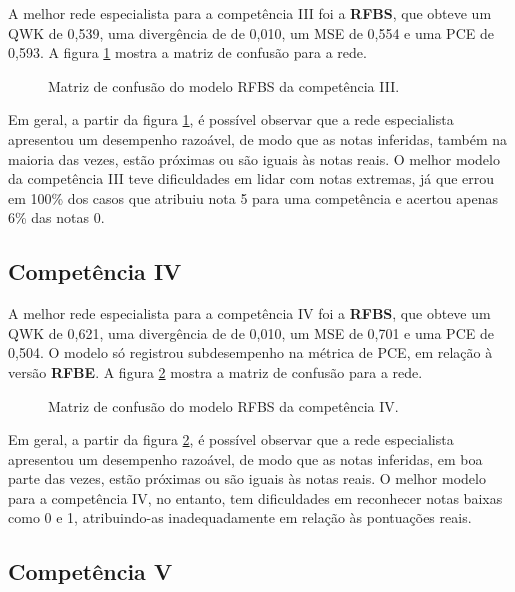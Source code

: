 A melhor rede especialista para a competência III foi a \textbf{RFBS}, que obteve um QWK de 0,539, uma divergência de de 0,010, um MSE de 0,554 e uma PCE de 0,593. A figura \ref{fig:eval-c3-confusion-matrix} mostra a matriz de confusão para a rede.

\begin{figure}[H]
    \centering
    \resizebox{0.5\textwidth}{!}{}
    \caption{Matriz de confusão do modelo RFBS da competência III.}
    \label{fig:eval-c3-confusion-matrix}
\end{figure}

Em geral, a partir da figura \ref{fig:eval-c3-confusion-matrix}, é possível observar que a rede especialista apresentou um desempenho razoável, de modo que as notas inferidas, também na maioria das vezes, estão próximas ou são iguais às notas reais. O melhor modelo da competência III teve dificuldades em lidar com notas extremas, já que errou em 100\% dos casos que atribuiu nota 5 para uma competência e acertou apenas 6\% das notas 0.

\subsection{Competência IV}
\label{subsec:eval-c4}

A melhor rede especialista para a competência IV foi a \textbf{RFBS}, que obteve um QWK de 0,621, uma divergência de de 0,010, um MSE de 0,701 e uma PCE de 0,504. O modelo só registrou subdesempenho na métrica de PCE, em relação à versão \textbf{RFBE}. A figura \ref{fig:eval-c4-confusion-matrix} mostra a matriz de confusão para a rede.

\begin{figure}[H]
    \centering
    \resizebox{0.5\textwidth}{!}{}
    \caption{Matriz de confusão do modelo RFBS da competência IV.}
    \label{fig:eval-c4-confusion-matrix}
\end{figure}

Em geral, a partir da figura \ref{fig:eval-c4-confusion-matrix}, é possível observar que a rede especialista apresentou um desempenho razoável, de modo que as notas inferidas, em boa parte das vezes, estão próximas ou são iguais às notas reais. O melhor modelo para a competência IV, no entanto, tem dificuldades em reconhecer notas baixas como 0 e 1, atribuindo-as inadequadamente em relação às pontuações reais.

\subsection{Competência V}
\label{subsec:eval-c5}

